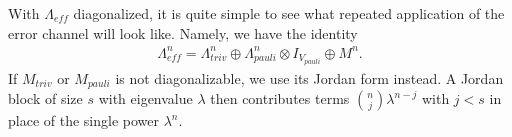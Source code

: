 With $\Lambda_{eff}$ diagonalized, it is quite simple to see what repeated application of the error channel will look like. Namely, we have the identity 
\begin{align}
    \Lambda_{eff}^n = \Lambda_{triv}^n \oplus \Lambda_{pauli}^n \otimes I_{V_{pauli}} \oplus M^n.
\end{align}
If $M_{triv}$ or $M_{pauli}$ is not diagonalizable, we use its Jordan form instead. A Jordan block of size $s$ with eigenvalue $\lambda$ then contributes terms $\binom{n}{j}\lambda^{n-j}$ with $j < s$ in place of the single power $\lambda^n$.



